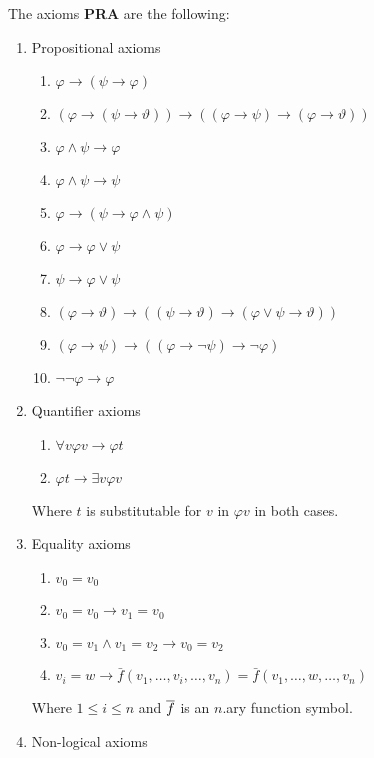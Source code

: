 \documentclass[../main.tex]{subfiles}
\begin{document}
\begin{defi}
	The axioms \textbf{PRA} are the following:
	\begin{enumerate}
		\item Propositional axioms
			\begin{enumerate}
				\item
					$\varphi\rightarrow(\psi\rightarrow\varphi)$
				\item
					$(\varphi\rightarrow(\psi\rightarrow\vartheta)
					)\rightarrow((\varphi\rightarrow\psi)\rightarrow
					(\varphi\rightarrow\vartheta))$
				\item $\varphi\wedge\psi\rightarrow\varphi$
				\item $\varphi\wedge\psi\rightarrow\psi$
				\item $\varphi\rightarrow
					(\psi\rightarrow\varphi\wedge\psi)$
				\item $\varphi\rightarrow\varphi\vee\psi$
				\item $\psi\rightarrow\varphi\vee\psi$
				\item
					$(\varphi\rightarrow\vartheta)\rightarrow((\psi\rightarrow
					\vartheta)\rightarrow(\varphi\vee\psi\rightarrow\vartheta))$
				\item
					$(\varphi\rightarrow\psi)\rightarrow((\varphi\rightarrow\neg\psi)
					\rightarrow\neg\varphi)$
				\item $\neg\neg\varphi\rightarrow\varphi$
			\end{enumerate}
		\item Quantifier axioms
			\begin{enumerate}
				\item $\forall v\varphi v\rightarrow \varphi t$
				\item $\varphi t\rightarrow \exists v\varphi
					v$
			\end{enumerate}
			Where $t$ is substitutable for $v$ in $\varphi v$ in
			both cases.
		\item Equality axioms
			\begin{enumerate}
				\item $v_0=v_0$
				\item $v_0=v_0\rightarrow v_1=v_0$
				\item $v_0=v_1\wedge v_1=v_2\rightarrow v_0=v_2$
				\item $v_i=w\rightarrow \bar{f}(v_1,\ldots,
					v_i,\ldots,v_n)=\bar{f}(v_1,\ldots,
					w,\ldots,v_n)$
			\end{enumerate}
			Where $1\leq i\leq n$ and $\overline{f}$ is an $n$.ary
			function symbol.
		\item Non-logical axioms

\end{enumerate}
\end{defi}
\end{document}
